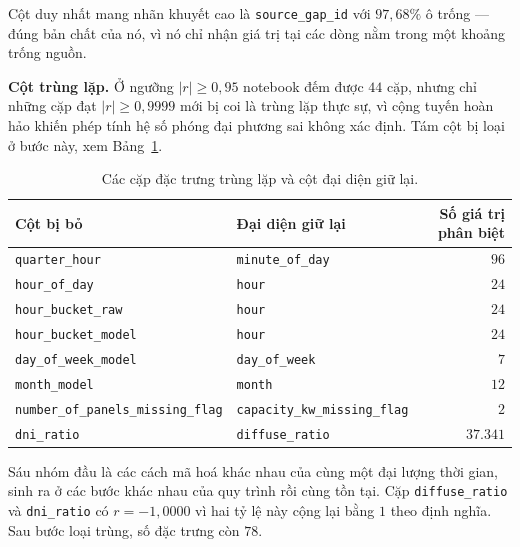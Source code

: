 \documentclass[12pt, a4paper]{report}
\begin{document}
Cột duy nhất mang nhãn khuyết cao là \texttt{source\_gap\_id} với $97{,}68\%$ ô trống --- đúng bản
chất của nó, vì nó chỉ nhận giá trị tại các dòng nằm trong một khoảng trống nguồn.

\textbf{Cột trùng lặp.} Ở ngưỡng $|r| \ge 0{,}95$ notebook đếm được $44$ cặp, nhưng chỉ những
cặp đạt $|r| \ge 0{,}9999$ mới bị coi là trùng lặp thực sự, vì cộng tuyến hoàn hảo khiến phép
tính hệ số phóng đại phương sai không xác định. Tám cột bị loại ở bước này, xem
Bảng~\ref{tab:trung_lap}.

\begin{table}[htbp]
\centering
\caption{Các cặp đặc trưng trùng lặp và cột đại diện giữ lại.}
\label{tab:trung_lap}
\footnotesize
\begin{tabular}{l l r}
\toprule
\textbf{Cột bị bỏ} & \textbf{Đại diện giữ lại} & \textbf{Số giá trị phân biệt} \\
\midrule
\texttt{quarter\_hour}                  & \texttt{minute\_of\_day}            & $96$ \\
\texttt{hour\_of\_day}                  & \texttt{hour}                       & $24$ \\
\texttt{hour\_bucket\_raw}              & \texttt{hour}                       & $24$ \\
\texttt{hour\_bucket\_model}            & \texttt{hour}                       & $24$ \\
\texttt{day\_of\_week\_model}           & \texttt{day\_of\_week}              & $7$ \\
\texttt{month\_model}                   & \texttt{month}                      & $12$ \\
\texttt{number\_of\_panels\_missing\_flag} & \texttt{capacity\_kw\_missing\_flag} & $2$ \\
\texttt{dni\_ratio}                     & \texttt{diffuse\_ratio}             & $37.341$ \\
\bottomrule
\end{tabular}
\end{table}

Sáu nhóm đầu là các cách mã hoá khác nhau của cùng một đại lượng thời gian, sinh ra ở các bước
khác nhau của quy trình rồi cùng tồn tại. Cặp \texttt{diffuse\_ratio} và \texttt{dni\_ratio} có
$r = -1{,}0000$ vì hai tỷ lệ này cộng lại bằng $1$ theo định nghĩa. Sau bước loại trùng, số đặc
trưng còn $78$.
\end{document}
